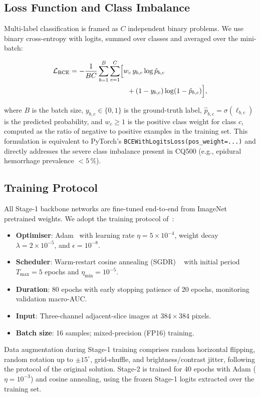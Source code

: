 \subsection{Loss Function and Class Imbalance}
\label{sec:loss}

Multi-label classification is framed as $C$ independent binary problems.
We use binary cross-entropy with logits, summed over classes and averaged
over the mini-batch:

\begin{align}
    \mathcal{L}_{\mathrm{BCE}} = -\frac{1}{BC} \sum_{b=1}^{B} \sum_{c=1}^{C}
        &\Bigl[ w_c \, y_{b,c} \log \hat{p}_{b,c} \nonumber \\
        &\quad + (1 - y_{b,c}) \log (1 - \hat{p}_{b,c}) \Bigr],
    \label{eq:bce}
\end{align}

where $B$ is the batch size, $y_{b,c} \in \{0,1\}$ is the ground-truth
label, $\hat{p}_{b,c} = \sigma(\ell_{b,c})$ is the predicted probability,
and $w_c \geq 1$ is the positive class weight for class $c$, computed as
the ratio of negative to positive examples in the training set.
This formulation is equivalent to PyTorch's
\texttt{BCEWithLogitsLoss(pos\_weight=...)} and directly addresses the
severe class imbalance present in CQ500 (e.g.,
epidural hemorrhage prevalence $< 5\,\%$).

\subsection{Training Protocol}
\label{sec:training}

All Stage-1 backbone networks are fine-tuned end-to-end from ImageNet
pretrained weights.
We adopt the training protocol of~\cite{wang2021deeplearning}:
\begin{itemize}
    \item \textbf{Optimiser}: Adam~\cite{kingma2015adam} with learning rate
          $\eta = 5 \times 10^{-4}$, weight decay $\lambda = 2 \times 10^{-5}$,
          and $\epsilon = 10^{-8}$.
    \item \textbf{Scheduler}: Warm-restart cosine annealing (SGDR)
          ~\cite{loshchilov2017sgdr} with initial period $T_{\max} = 5$ epochs
          and $\eta_{\min} = 10^{-5}$.
    \item \textbf{Duration}: 80 epochs with early stopping patience of 20
          epochs, monitoring validation macro-AUC.
    \item \textbf{Input}: Three-channel adjacent-slice images at
          $384 \times 384$ pixels.
    \item \textbf{Batch size}: 16 samples; mixed-precision (FP16) training.
\end{itemize}

Data augmentation during Stage-1 training comprises random horizontal
flipping, random rotation up to $\pm 15^{\circ}$, grid-shuffle, and
brightness/contrast jitter, following the protocol of the original
solution.
Stage-2 is trained for 40 epochs with Adam ($\eta = 10^{-3}$) and cosine
annealing, using the frozen Stage-1 logits extracted over the training set.
